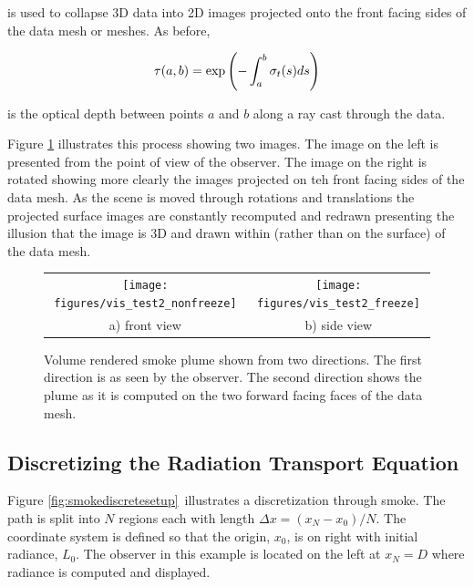 is used to collapse 3D data into 2D images projected onto the front facing sides of the data mesh or meshes. As before,

\begin{equation}
\label{eq:optdepth}
\tau(a,b)=\exp\left({-\int_a^b \sigma_t(s) ds}\right)
\end{equation}

is the optical depth between points $a$ and $b$ along a ray cast through the data.

Figure \ref{fig:volplume_example} illustrates this process showing two images.  
The image on the left is presented from the point of view of the observer.  The image on the right is rotated showing more clearly the images projected on teh front facing sides of the data mesh.  As the scene is moved through rotations and translations the projected surface images are constantly recomputed and redrawn presenting the illusion that the image is 3D and drawn within (rather than on the surface) of the data mesh.

\begin{figure}[\figoptions]
\begin{center}
\begin{tabular}{cc}
\texttt{[image: figures/vis\_test2\_nonfreeze]}&
\texttt{[image: figures/vis\_test2\_freeze]}\\
a) front view&b) side view\\
\end{tabular}
\end{center}
\caption[Volume rendered smoke plume shown from two directions.]{Volume rendered smoke plume shown from two directions.
The first direction is as seen by the observer.  The second direction shows
the plume as it is computed on the two forward facing faces of the data mesh.
}
\label{fig:volplume_example}
\end{figure}

\subsection{Discretizing the Radiation Transport Equation}
\newcommand{\htau}[1]{\tau_{#1}^{N-1}}
\newcommand{\sigai}[1]{\sigma_{a,#1}}
\newcommand{\Lei}[1]{L_{e,#1}}
\newcommand{\Lhatj}[1]{L_{#1}^N}
\newcommand{\Lhatjj}[1]{\hat{L}_{#1}^N}
\newcommand{\Leii}[1]{\hat{L}_{e,#1}}


Figure \ref{fig:smokediscretesetup}\ illustrates a discretization through  smoke.  The path is split into $N$ regions each with length $\Delta x=(x_N-x_0)/N$.  The coordinate system is defined so that the origin, $x_0$, is on right with initial radiance, $L_0$.  The observer in this example is located on the left at $x_N=D$  where radiance is computed and displayed.  

